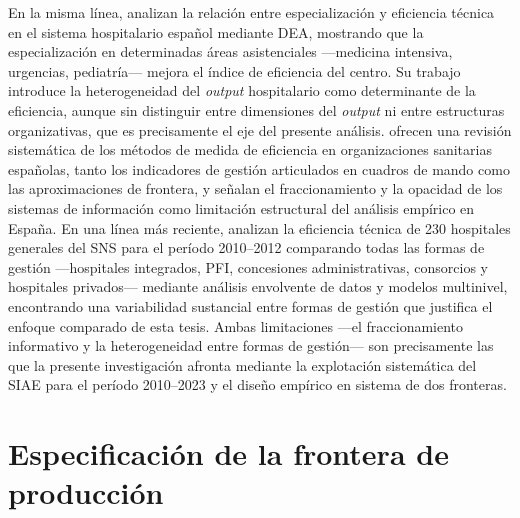 En la misma línea, \citet{rodriguez_sanchez2004} analizan la relación entre especialización y eficiencia técnica en el sistema hospitalario español mediante DEA, mostrando que la especialización en determinadas áreas asistenciales ---medicina intensiva, urgencias, pediatría--- mejora el índice de eficiencia del centro. Su trabajo introduce la heterogeneidad del \textit{output} hospitalario como determinante de la eficiencia, aunque sin distinguir entre dimensiones del \textit{output} ni entre estructuras organizativas, que es precisamente el eje del presente análisis. \citet{martin2007medida} ofrecen una revisión sistemática de los 
métodos de medida de eficiencia en organizaciones sanitarias 
españolas, tanto los indicadores de gestión articulados en cuadros 
de mando como las aproximaciones de frontera, y señalan el 
fraccionamiento y la opacidad de los sistemas de información como 
limitación estructural del análisis empírico en España. En una 
línea más reciente, \citet{martin2019eficiencia} analizan la 
eficiencia técnica de 230 hospitales generales del SNS para el 
período 2010--2012 comparando todas las formas de gestión 
---hospitales integrados, PFI, concesiones administrativas, 
consorcios y hospitales privados--- mediante análisis envolvente 
de datos y modelos multinivel, encontrando una variabilidad 
sustancial entre formas de gestión que justifica el enfoque 
comparado de esta tesis. Ambas limitaciones ---el fraccionamiento 
informativo y la heterogeneidad entre formas de gestión--- son 
precisamente las que la presente investigación afronta mediante 
la explotación sistemática del SIAE para el período 2010--2023 
y el diseño empírico en sistema de dos fronteras.

\section{Especificación de la frontera de producción}

